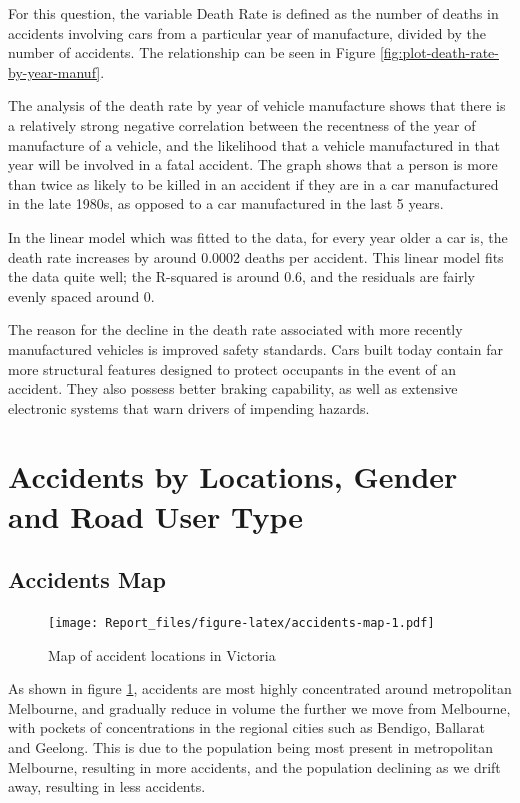\documentclass[11pt,a4paper,]{article}
\begin{document}
For this question, the variable Death Rate is defined as the number of deaths in accidents involving cars from a particular year of manufacture, divided by the number of accidents. The relationship can be seen in Figure \ref{fig:plot-death-rate-by-year-manuf}.

The analysis of the death rate by year of vehicle manufacture shows that there is a relatively strong negative correlation between the recentness of the year of manufacture of a vehicle, and the likelihood that a vehicle manufactured in that year will be involved in a fatal accident. The graph shows that a person is more than twice as likely to be killed in an accident if they are in a car manufactured in the late 1980s, as opposed to a car manufactured in the last 5 years.

In the linear model which was fitted to the data, for every year older a car is, the death rate increases by around 0.0002 deaths per accident. This linear model fits the data quite well; the R-squared is around 0.6, and the residuals are fairly evenly spaced around 0.

The reason for the decline in the death rate associated with more recently manufactured vehicles is improved safety standards. Cars built today contain far more structural features designed to protect occupants in the event of an accident. They also possess better braking capability, as well as extensive electronic systems that warn drivers of impending hazards.

\section*{Accidents by Locations, Gender and Road User Type}

\subsection*{Accidents Map}

\begin{figure}
\centering
\texttt{[image: Report\_files/figure-latex/accidents-map-1.pdf]}
\caption{\label{fig:accidents-map}Map of accident locations in Victoria}
\end{figure}

As shown in figure \ref{fig:accidents-map}, accidents are most highly concentrated around metropolitan Melbourne, and gradually reduce in volume the further we move from Melbourne, with pockets of concentrations in the regional cities such as Bendigo, Ballarat and Geelong. This is due to the population being most present in metropolitan Melbourne, resulting in more accidents, and the population declining as we drift away, resulting in less accidents.
\end{document}

